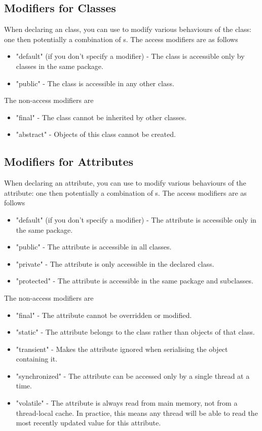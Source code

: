 \documentclass[11pt]{report}
\begin{document}
\subsection{Modifiers for Classes}
When declaring an class, you can use  to modify various behaviours of the class: one  then potentially a combination of s. The access modifiers are as follows
\begin{itemize}
    \item \inlineJava"default" (if you don't specify a modifier) - The class is accessible only by classes in the same package.
    \item \inlineJava"public" - The class is accessible in any other class.
\end{itemize}
The non-access modifiers are
\begin{itemize}
    \item \inlineJava"final" - The class cannot be inherited by other classes.
    \item \inlineJava"abstract" - Objects of this class cannot be created.
\end{itemize}


\subsection{Modifiers for Attributes}
When declaring an attribute, you can use  to modify various behaviours of the attribute: one  then potentially a combination of s. The access modifiers are as follows
\begin{itemize}
    \item \inlineJava"default" (if you don't specify a modifier) - The attribute is accessible only in the same package.
    \item \inlineJava"public" - The attribute is accessible in all classes.
    \item \inlineJava"private" - The attribute is only accessible in the declared class.
    \item \inlineJava"protected" - The attribute is accessible in the same package and subclasses.
\end{itemize}
The non-access modifiers are
\begin{itemize}
    \item \inlineJava"final" - The attribute cannot be overridden or modified.
    \item \inlineJava"static" - The attribute belongs to the class rather than objects of that class.
    \item \inlineJava"transient" - Makes the attribute ignored when serialising the object containing it.
    \item \inlineJava"synchronized" - The attribute can be accessed only by a single thread at a time.
    \item \inlineJava"volatile" - The attribute is always read from main memory, not from a thread-local cache. In practice, this means any thread will be able to read the most recently updated value for this attribute.
\end{itemize}
\end{document}
